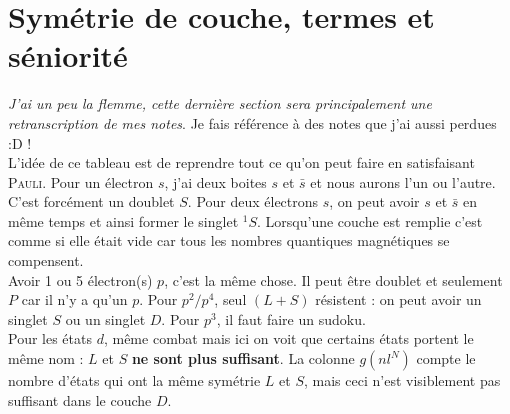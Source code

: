 \section{Symétrie de couche, termes et séniorité}
\textit{J'ai un peu la flemme, cette dernière section sera principalement une retranscription
de mes notes}. Je fais référence à des notes que j'ai aussi perdues :D !\\

L'idée de ce tableau est de reprendre tout ce qu'on peut faire en satisfaisant \textsc{Pauli}.
Pour un électron $s$, j'ai deux boites $s$ et $\bar{s}$ et nous aurons l'un ou l'autre. C'est
forcément un doublet $S$. Pour deux électrons $s$, on peut avoir $s$ et $\bar s$ en même temps
et ainsi former le singlet $^1S$. Lorsqu'une couche est remplie c'est comme si elle était vide
car tous les nombres quantiques magnétiques se compensent. \\

Avoir 1 ou 5 électron(s) $p$, c'est la même chose. Il peut être doublet et seulement $P$ car il n'y
a qu'un $p$. Pour $p^2/p^4$, seul $(L+S)$ résistent  : on peut avoir un singlet $S$ ou un 
singlet $D$. Pour $p^3$, il faut faire un sudoku.\\

Pour les états $d$, même combat mais ici on voit que certains états portent le même nom  : $L$ et
$S$ \textbf{ne sont plus suffisant}. La colonne $g(nl^N)$ compte le nombre d'états qui ont la 
même symétrie $L$ et $S$, mais ceci n'est visiblement pas suffisant dans le couche $D$.\\

